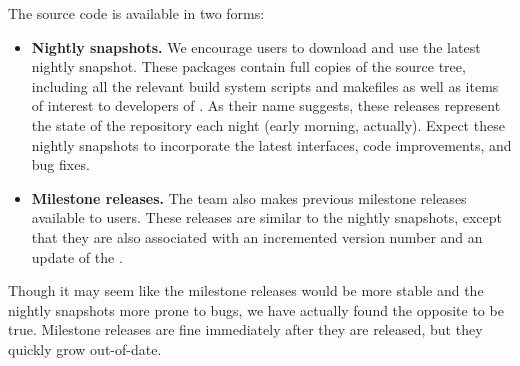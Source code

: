 
The \libflame source code is available in two forms:
\begin{itemize}
\item
{\bf Nightly snapshots.}
We encourage users to download and use the latest nightly snapshot.
These packages contain full copies of the \libflame source tree, including
all the relevant build system scripts and makefiles as well as items of
interest to developers of \libflamens.
As their name suggests, these releases represent the state of the \libflame
repository each night (early morning, actually).
Expect these nightly snapshots to incorporate the latest interfaces,
code improvements, and bug fixes.
\item
{\bf Milestone releases.}
The \libflame team also makes previous milestone releases available to
users.
These releases are similar to the nightly snapshots, except that they are
also associated with an incremented version number and an update of the
\changelogns.
\end{itemize}
Though it may seem like the milestone releases would be more stable and the
nightly snapshots more prone to bugs, we have actually found the opposite
to be true.
Milestone releases are fine immediately after they are released, but they
quickly grow out-of-date.
